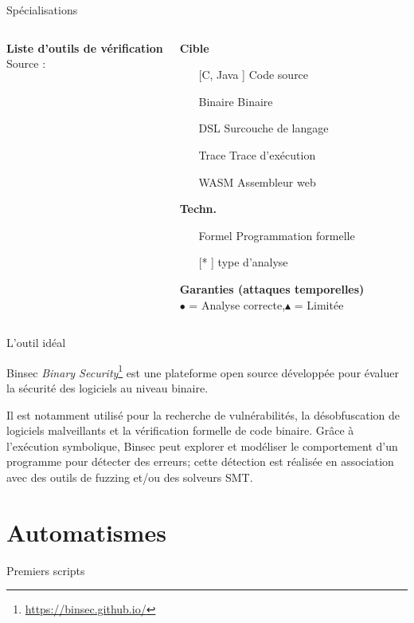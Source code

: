 \documentclass{backend/backend}
\begin{document}
{\begin{frame}{Spécialisations}
\begin{columns}
    \textbf{Liste d’outils de vérification}\\[1ex]
    Source : \cite{notThatHardCT}\\[2ex]
    \begin{scriptsize}
        
        \textbf{Cible}
        \begin{itemize}
        \item[[C, Java]] Code source
        \item[Binaire] Binaire
        \item[DSL] Surcouche de langage
        \item[Trace] Trace d'exécution
        \item[WASM] Assembleur web
    \end{itemize}
    \textbf{Techn.}
    \begin{itemize}
        \item[Formel] Programmation formelle 
        \item[[*]] type d'analyse
    \end{itemize}
    \textbf{Garanties (attaques temporelles)}\\
        $\bullet$ = Analyse correcte,$\blacktriangle$ =  Limitée
    \end{scriptsize}
    \end{columns}
\end{frame}

\begin{frame}{L'outil idéal}
    \begin{exampleblock}{Binsec}
       \textit{Binary Security}\footnote{\url{https://binsec.github.io/}} est une plateforme open source développée pour évaluer la sécurité des logiciels au niveau binaire. 
       
       Il est notamment utilisé pour la recherche de vulnérabilités, la désobfuscation de logiciels malveillants et la vérification formelle de code binaire. Grâce à l'exécution symbolique, Binsec peut explorer et modéliser le comportement d'un programme pour détecter des erreurs; cette détection est réalisée en association avec des outils de fuzzing et/ou des solveurs SMT.
    \end{exampleblock}
\end{frame}

\section{Automatismes}
\begin{frame}[fragile]{Premiers scripts}


\end{frame}}
\end{document}
